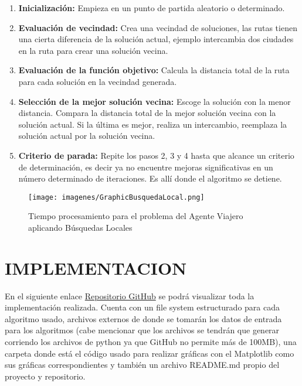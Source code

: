 \documentclass{article}
\begin{document}
    \begin{enumerate}
        \item \textbf{Inicialización:} Empieza en un punto de partida aleatorio o determinado.
        
        \item \textbf{Evaluación de vecindad:} Crea una vecindad de soluciones, las rutas tienen una cierta diferencia de la solución actual, ejemplo intercambia dos ciudades en la ruta para crear una solución vecina.
        
        \item \textbf{Evaluación de la función objetivo:} Calcula la distancia total de la ruta para cada solución en la vecindad generada. 
        
        \item \textbf{Selección de la mejor solución vecina:} Escoge la solución con la menor distancia. Compara la distancia total de la mejor solución vecina con la solución actual. Si la última es mejor, realiza un intercambio, reemplaza la solución actual por la solución vecina. 
        
        \item \textbf{Criterio de parada:} Repite los pasos 2, 3 y 4 hasta que alcance un criterio de determinación, es decir ya no encuentre mejoras significativas en un número determinado de iteraciones. Es allí donde el algoritmo se detiene.
    \end{enumerate}

\begin{figure}[H]
    \centering
    \texttt{[image: imagenes/GraphicBusquedaLocal.png]}
    \caption{\label{fig:GraphicBusquedaLocal}Tiempo procesamiento para el problema del Agente Viajero aplicando Búsquedas Locales}
\end{figure}



\section{IMPLEMENTACION}
En el siguiente enlace \href{https://github.com/abelborit/computer-science-master/tree/main/MCC-01_algorithms-and-data-structures/graphs-analysis}{Repositorio GitHub} se podrá visualizar toda la implementación realizada. Cuenta con un file system estructurado para cada algoritmo usado, archivos externos de donde se tomarán los datos de entrada para los algoritmos (cabe mencionar que los archivos se tendrán que generar corriendo los archivos de python ya que GitHub no permite más de 100MB), una carpeta donde está el código usado para realizar gráficas con el Matplotlib como sus gráficas correspondientes y también un archivo README.md propio del proyecto y repositorio.
\end{document}
